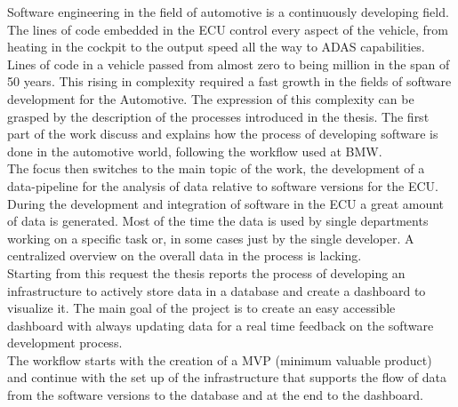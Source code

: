 \documentclass[../main.tex]{subfiles}
\begin{document}
Software engineering in the field of automotive is a continuously developing field. The lines of code embedded in the ECU control every aspect of the vehicle, from heating in the cockpit to the output speed all the way to ADAS capabilities. Lines of code in a vehicle passed from almost zero to being million in the span of 50 years. This rising in complexity required a fast growth in the fields of software development for the Automotive. The expression of this complexity can be grasped by the description of the processes introduced in the thesis. The first part of the work discuss and explains how the process of developing software is done in the automotive world, following the workflow used at BMW.\\
The focus then switches to the main topic of the work, the development of a data-pipeline for the analysis of data relative to software versions for the ECU. During the development and integration of software in the ECU a great amount of data is generated. Most of the time the data is used by single departments working on a specific task or, in some cases just by the single developer. A centralized overview on the overall data in the process is lacking.\\
Starting from this request the thesis reports the process of developing an infrastructure to actively store data in a database and create a dashboard to visualize it. The main goal of the project is to create an easy accessible dashboard with always updating data for a real time feedback on the software development process.\\
The workflow starts with the creation of a MVP (minimum valuable product) and continue with the set up of the infrastructure that supports the flow of data from the software versions to the database and at the end to the dashboard.\\

\cleardoublepage
\end{document}
